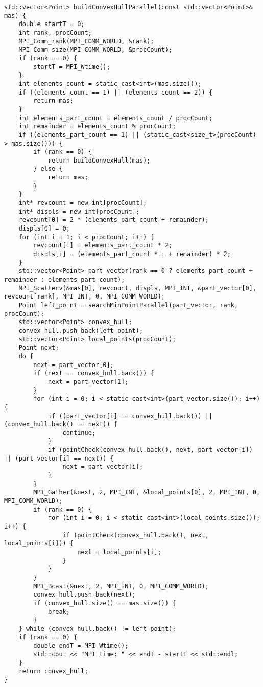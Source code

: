 \documentclass{report}
\begin{document}
\begin{lstlisting}
std::vector<Point> buildConvexHullParallel(const std::vector<Point>& mas) {
    double startT = 0;
    int rank, procCount;
    MPI_Comm_rank(MPI_COMM_WORLD, &rank);
    MPI_Comm_size(MPI_COMM_WORLD, &procCount);
    if (rank == 0) {
        startT = MPI_Wtime();
    }
    int elements_count = static_cast<int>(mas.size());
    if ((elements_count == 1) || (elements_count == 2)) {
        return mas;
    }
    int elements_part_count = elements_count / procCount;
    int remainder = elements_count % procCount;
    if ((elements_part_count == 1) || (static_cast<size_t>(procCount) > mas.size())) {
        if (rank == 0) {
            return buildConvexHull(mas);
        } else {
            return mas;
        }
    }
    int* revcount = new int[procCount];
    int* displs = new int[procCount];
    revcount[0] = 2 * (elements_part_count + remainder);
    displs[0] = 0;
    for (int i = 1; i < procCount; i++) {
        revcount[i] = elements_part_count * 2;
        displs[i] = (elements_part_count * i + remainder) * 2;
    }
    std::vector<Point> part_vector(rank == 0 ? elements_part_count + remainder : elements_part_count);
    MPI_Scatterv(&mas[0], revcount, displs, MPI_INT, &part_vector[0], revcount[rank], MPI_INT, 0, MPI_COMM_WORLD);
    Point left_point = searchMinPointParallel(part_vector, rank, procCount);
    std::vector<Point> convex_hull;
    convex_hull.push_back(left_point);
    std::vector<Point> local_points(procCount);
    Point next;
    do {
        next = part_vector[0];
        if (next == convex_hull.back()) {
            next = part_vector[1];
        }
        for (int i = 0; i < static_cast<int>(part_vector.size()); i++) {
            if ((part_vector[i] == convex_hull.back()) || (convex_hull.back() == next)) {
                continue;
            }
            if (pointCheck(convex_hull.back(), next, part_vector[i]) || (part_vector[i] == next)) {
                next = part_vector[i];
            }
        }
        MPI_Gather(&next, 2, MPI_INT, &local_points[0], 2, MPI_INT, 0, MPI_COMM_WORLD);
        if (rank == 0) {
            for (int i = 0; i < static_cast<int>(local_points.size()); i++) {
                if (pointCheck(convex_hull.back(), next, local_points[i])) {
                    next = local_points[i];
                }
            }
        }
        MPI_Bcast(&next, 2, MPI_INT, 0, MPI_COMM_WORLD);
        convex_hull.push_back(next);
        if (convex_hull.size() == mas.size()) {
            break;
        }
    } while (convex_hull.back() != left_point);
    if (rank == 0) {
        double endT = MPI_Wtime();
        std::cout << "MPI time: " << endT - startT << std::endl;
    }
    return convex_hull;
}


\end{lstlisting}
\end{document}
